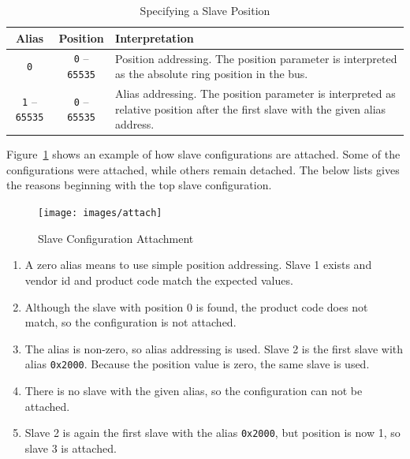 \documentclass[a4paper,12pt,BCOR6mm,bibtotoc,idxtotoc]{scrbook}
\begin{document}
\begin{table}[htbp]
  \centering
  \caption{Specifying a Slave Position}
  \label{tab:slaveposition}
  \vspace{2mm}
  \begin{tabular}{c|c|p{70mm}}
    Alias & Position & Interpretation\\
    \hline

    \lstinline+0+ & \lstinline+0+ -- \lstinline+65535+ &

    Position addressing. The position parameter is interpreted as the absolute
    ring position in the bus.\\ \hline

    \lstinline+1+ -- \lstinline+65535+ & \lstinline+0+ -- \lstinline+65535+ &

    Alias addressing. The position parameter is interpreted as relative
    position after the first slave with the given alias address. \\ \hline

  \end{tabular}
\end{table}

Figure~\ref{fig:attach} shows an example of how slave configurations are
attached. Some of the configurations were attached, while others remain
detached. The below lists gives the reasons beginning with the top slave
configuration.

\begin{figure}[htbp]
  \centering
  \texttt{[image: images/attach]}
  \caption{Slave Configuration Attachment}
  \label{fig:attach}
\end{figure}

\begin{enumerate}

\item A zero alias means to use simple position addressing. Slave 1 exists and
vendor id and product code match the expected values.

\item Although the slave with position 0 is found, the product code does not
match, so the configuration is not attached.

\item The alias is non-zero, so alias addressing is used. Slave 2 is the first
slave with alias \lstinline+0x2000+. Because the position value is zero, the
same slave is used.

\item There is no slave with the given alias, so the configuration can not be
attached.

\item Slave 2 is again the first slave with the alias \lstinline+0x2000+, but
position is now 1, so slave 3 is attached.

\end{enumerate}
\end{document}
